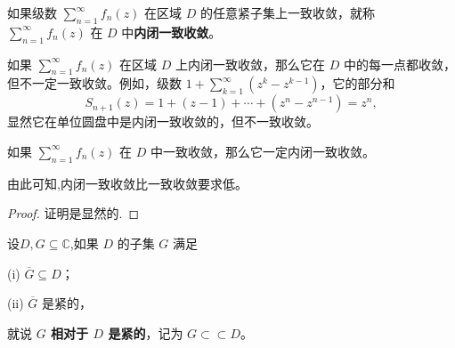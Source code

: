 \documentclass[../../main.tex]{subfiles}%
\begin{document}
\begin{definition}
如果级数 \( \sum_{n=1}^{\infty} f_n(z) \) 在区域 \( D \) 的任意紧子集上一致收敛，就称 \( \sum_{n=1}^{\infty} f_n(z) \) 在 \( D \) 中\textbf{内闭一致收敛}。
\end{definition}
\begin{remark}
如果 \( \sum_{n=1}^{\infty} f_n(z) \) 在区域 \( D \) 上内闭一致收敛，那么它在 \( D \) 中的每一点都收敛，但不一定一致收敛。例如，级数 \( 1 + \sum_{k=1}^{\infty} (z^k - z^{k - 1}) \)，它的部分和
\[
S_{n + 1}(z) = 1 + (z - 1) + \cdots + (z^n - z^{n - 1}) = z^n,
\]
显然它在单位圆盘中是内闭一致收敛的，但不一致收敛。
\end{remark}

\begin{proposition}
如果 \( \sum_{n=1}^{\infty} f_n(z) \) 在 \( D \) 中一致收敛，那么它一定内闭一致收敛。
\end{proposition}
\begin{note}
由此可知,内闭一致收敛比一致收敛要求低。
\end{note}
\begin{proof}

证明是显然的.

\end{proof}

\begin{definition}
设$D,G\subseteq \mathbb{C}$,如果 \( D \) 的子集 \( G \) 满足

(i) \( \overline{G} \subseteq D \)；

(ii) \( \overline{G} \) 是紧的，

就说 \textbf{\( G \) 相对于 \( D \) 是紧的}，记为 \( G \subset\subset D \)。
\end{definition}
\end{document}
